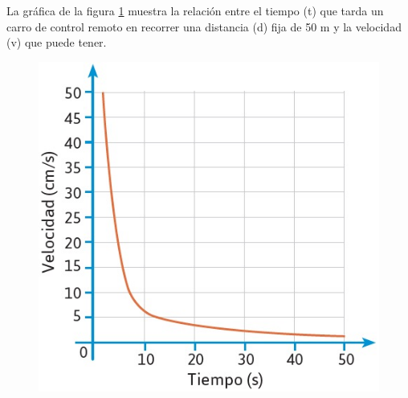 \documentclass[11pt]{book}
\begin{document}
\begin{enumerate}
        La gráfica de la figura \ref{fig:carro_control} muestra la relación entre el tiempo (t) que tarda un carro de control remoto en recorrer una distancia (d) fija de 50 m y la velocidad (v) que puede tener.
        \begin{minipage}[t]{0.45\linewidth}
          \begin{figure}[H]
            \centering
            \includegraphics[width=\linewidth]{carro_control.jpg}
            \label{fig:carro_control}
          \end{figure}%
          \begin{figure}[H]
            \centering

\end{figure}
\end{minipage}
\end{enumerate}
\end{document}
